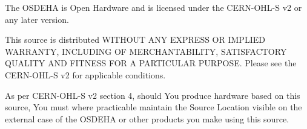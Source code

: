The OSDEHA is Open Hardware and is licensed under the CERN-OHL-S v2 or any later version.


This source is distributed WITHOUT ANY EXPRESS OR IMPLIED WARRANTY, INCLUDING OF MERCHANTABILITY, SATISFACTORY QUALITY AND FITNESS FOR A PARTICULAR PURPOSE. Please see the CERN-OHL-S v2 for applicable conditions.


As per CERN-OHL-S v2 section 4, should You produce hardware based on this source, You must where practicable maintain the Source Location visible on the external case of the OSDEHA or other products you make using this source.            


% 
% 


